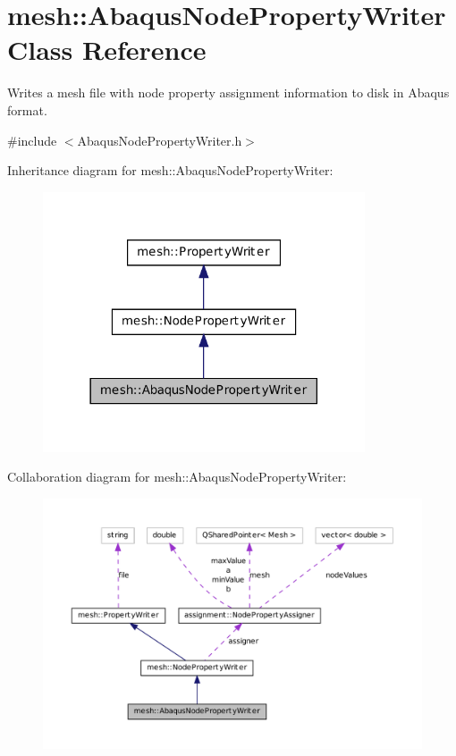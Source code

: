\hypertarget{classmesh_1_1_abaqus_node_property_writer}{
\section{mesh::AbaqusNodePropertyWriter Class Reference}
\label{classmesh_1_1_abaqus_node_property_writer}
}


Writes a mesh file with node property assignment information to disk in Abaqus format.  




{\ttfamily \#include $<$AbaqusNodePropertyWriter.h$>$}



Inheritance diagram for mesh::AbaqusNodePropertyWriter:\nopagebreak
\begin{figure}[H]
\begin{center}
\leavevmode
\includegraphics[width=270pt]{classmesh_1_1_abaqus_node_property_writer__inherit__graph}
\end{center}
\end{figure}


Collaboration diagram for mesh::AbaqusNodePropertyWriter:\nopagebreak
\begin{figure}[H]
\begin{center}
\leavevmode
\includegraphics[width=400pt]{classmesh_1_1_abaqus_node_property_writer__coll__graph}
\end{center}
\end{figure}
